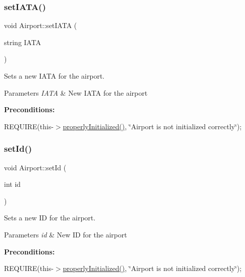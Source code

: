 \subsubsection{\texorpdfstring{set\+I\+A\+T\+A()}{setIATA()}}
{\footnotesize\ttfamily void Airport\+::set\+I\+A\+TA (\begin{DoxyParamCaption}\item[{string}]{I\+A\+TA }\end{DoxyParamCaption})}



Sets a new I\+A\+TA for the airport. 


\begin{DoxyParams}{Parameters}
{\em I\+A\+TA} & New I\+A\+TA for the airport\\
\hline
\end{DoxyParams}
{\bfseries Preconditions\+:}
\begin{DoxyItemize}
\item R\+E\+Q\+U\+I\+RE(this-\/$>$\mbox{\hyperlink{class_airport_aa13e68ac58e8875837fbe888325cfff6}{properly\+Initialized()}}, \char`\"{}\+Airport is not initialized correctly\char`\"{}); 
\end{DoxyItemize}\mbox{\label{class_airport_a3b8ef3abafb9f29b97acb73eb8014502}} 
\subsubsection{\texorpdfstring{set\+Id()}{setId()}}
{\footnotesize\ttfamily void Airport\+::set\+Id (\begin{DoxyParamCaption}\item[{int}]{id }\end{DoxyParamCaption})}



Sets a new ID for the airport. 


\begin{DoxyParams}{Parameters}
{\em id} & New ID for the airport\\
\hline
\end{DoxyParams}
{\bfseries Preconditions\+:}
\begin{DoxyItemize}
\item R\+E\+Q\+U\+I\+RE(this-\/$>$\mbox{\hyperlink{class_airport_aa13e68ac58e8875837fbe888325cfff6}{properly\+Initialized()}}, \char`\"{}\+Airport is not initialized correctly\char`\"{}); 
\end{DoxyItemize}\mbox{\label{class_airport_a064fd9435cd179b04d94c04a18a96583}} 
